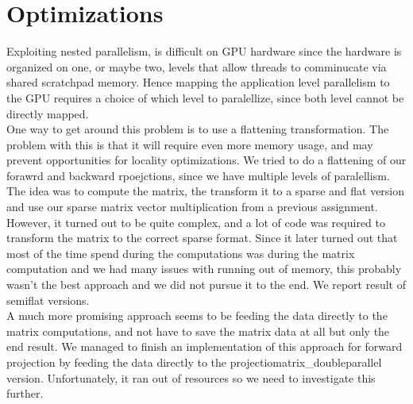 \section{Optimizations}
Exploiting nested parallelism, is difficult on GPU hardware since the hardware is organized on one, or maybe two, levels that allow threads to comminucate via shared scratchpad memory. Hence mapping the application level parallelism to the GPU requires a choice of which level to paralellize, since both level cannot be directly mapped.\\
One way to get around this problem is to use a flattening transformation. The problem with this is that it will require even more memory usage, and may prevent opportunities for locality optimizations. We tried to do a flattening of our forawrd and backward rpoejctions, since we have multiple levels of paralellism. The idea was to compute the matrix, the transform it to a sparse and flat version and use our sparse matrix vector multiplication from a previous assignment. However, it turned out to be quite complex, and a lot of code was required to transform the matrix to the correct sparse format. Since it later turned out that most of the time spend during the computations was during the matrix computation and we had many issues with running out of memory, this probably wasn't the best approach and we did not pursue it to the end. We report result of semiflat versions.\\
A much more promising approach seems to be feeding the data directly to the matrix computations, and not have to save the matrix data at all but only the end result. We managed to finish an implementation of this approach for forward projection by feeding the data directly to the projectiomatrix\_doubleparallel version. Unfortunately, it ran out of resources so we need to investigate this further.\\
